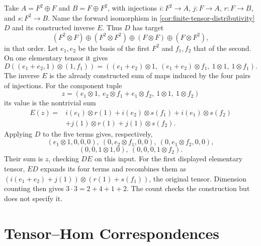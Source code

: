 \begin{example}\label{ex:four-tensor-components}
Take $A=F^2\oplus F$ and $B=F\oplus F^2$, with injections
$i:F^2\to A$, $j:F\to A$, $r:F\to B$, and $s:F^2\to B$.
Name the forward isomorphism in \cref{cor:finite-tensor-distributivity}
$D$ and its constructed inverse $E$. Thus $D$ has target
\[
(F^2\otimes F)\oplus(F^2\otimes F^2)
\oplus(F\otimes F)\oplus(F\otimes F^2),
\]
in that order. Let $e_1,e_2$ be the basis of the first $F^2$ and $f_1,f_2$
that of the second. On one elementary tensor it gives
\[
D((e_1+e_2,1)\otimes(1,f_1))
=((e_1+e_2)\otimes1,\ (e_1+e_2)\otimes f_1,\ 1\otimes1,\ 1\otimes f_1).
\]
The inverse $E$ is the already constructed sum of maps induced by the
four pairs of injections. For the component tuple
\[
z=(e_1\otimes1,\ e_2\otimes f_1+e_1\otimes f_2,\ 1\otimes1,\ 1\otimes f_2)
\]
its value is the nontrivial sum
\begin{align*}
E(z)={}&i(e_1)\otimes r(1)+i(e_2)\otimes s(f_1)
+i(e_1)\otimes s(f_2)\\
&+j(1)\otimes r(1)+j(1)\otimes s(f_2).
\end{align*}
Applying $D$ to the five terms gives, respectively,
\[
(e_1\otimes1,0,0,0),\ (0,e_2\otimes f_1,0,0),\ (0,e_1\otimes f_2,0,0),
\]
\[
(0,0,1\otimes1,0),\ (0,0,0,1\otimes f_2).
\]
Their sum is $z$, checking $DE$ on this input. For the first displayed
elementary tensor, $ED$ expands its four terms and recombines them as
$(i(e_1+e_2)+j(1))\otimes(r(1)+s(f_1))$, the original tensor.
Dimension counting then gives
$3\cdot3=2+4+1+2$. The count checks the construction but does not specify it.
\end{example}

\section{Tensor--Hom Correspondences}
